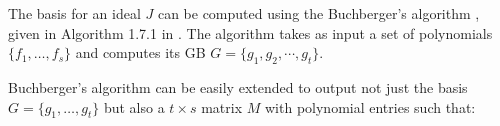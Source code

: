 The \Grobner basis for an ideal $J$ can be
computed using the  Buchberger's algorithm \cite{buchberger_thesis},
given in Algorithm 1.7.1 in \cite{gb_book}. The algorithm takes as
input a set of polynomials $\{f_1,\dots, f_s\}$ and 
computes its GB $G = \{g_1,g_2,\cdots,g_t\}$. 




Buchberger's algorithm can be easily extended to output 
not just the \Grobner basis $G=\{g_1,\dots,g_t\}$ but also a $t\times
s$ matrix $M$ with polynomial entries such that:

